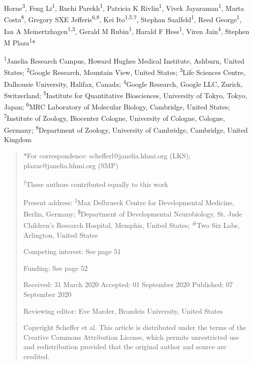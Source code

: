 \documentclass{article}
\begin{document}
Horne\textsuperscript{3}, Feng Li\textsuperscript{1}, Ruchi Parekh\textsuperscript{1}, Patricia K Rivlin\textsuperscript{1}, Vivek Jayaraman\textsuperscript{1}, Marta Costa\textsuperscript{8}, Gregory SXE Jefferis\textsuperscript{6,8}, Kei Ito\textsuperscript{1,5,7}, Stephan Saalfeld\textsuperscript{1}, Reed George\textsuperscript{1}, Ian A Meinertzhagen\textsuperscript{1,3}, Gerald M Rubin\textsuperscript{1}, Harald F Hess\textsuperscript{1}, Viren Jain\textsuperscript{4}, Stephen M Plaza\textsuperscript{1}*

\noindent \textsuperscript{1}Janelia Research Campus, Howard Hughes Medical Institute, Ashburn, United States; \textsuperscript{2}Google Research, Mountain View, United States; \textsuperscript{3}Life Sciences Centre, Dalhousie University, Halifax, Canada; \textsuperscript{4}Google Research, Google LLC, Zurich, Switzerland; \textsuperscript{5}Institute for Quantitative Biosciences, University of Tokyo, Tokyo, Japan; \textsuperscript{6}MRC Laboratory of Molecular Biology, Cambridge, United States; \textsuperscript{7}Institute of Zoology, Biocenter Cologne, University of Cologne, Cologne, Germany; \textsuperscript{8}Department of Zoology, University of Cambridge, Cambridge, United Kingdom

\begin{quote}\small
*For correspondence: schefferl@janelia.hhmi.org (LKS); plazas@janelia.hhmi.org (SMP)\par
\textsuperscript{†}These authors contributed equally to this work\par
Present address: \textsuperscript{‡}Max Delbrueck Centre for Developmental Medicine, Berlin, Germany; \textsuperscript{§}Department of Developmental Neurobiology, St. Jude Children’s Research Hospital, Memphis, United States; \textsuperscript{\#}Two Six Labs, Arlington, United States\par
Competing interest: See page 51\par
Funding: See page 52\par
Received: 31 March 2020 Accepted: 01 September 2020 Published: 07 September 2020\par
Reviewing editor: Eve Marder, Brandeis University, United States\par
Copyright Scheffer et al. This
article is distributed under the terms of the Creative Commons Attribution License, which permits unrestricted use and redistribution provided that the original author and source are credited.
\end{quote}
\end{document}
